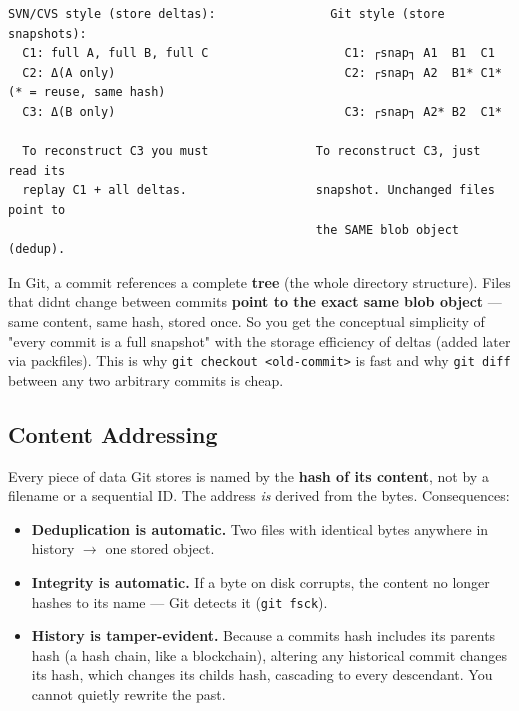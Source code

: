 \documentclass[11pt]{article}
\providecommand{\tightlist}{\setlength{\itemsep}{1pt}\setlength{\parskip}{0pt}}
\begin{document}
\setcodelang{}

\begin{verbatim}
SVN/CVS style (store deltas):                Git style (store snapshots):
  C1: full A, full B, full C                   C1: ┌snap┐ A1  B1  C1
  C2: Δ(A only)                                C2: ┌snap┐ A2  B1* C1*   (* = reuse, same hash)
  C3: Δ(B only)                                C3: ┌snap┐ A2* B2  C1*

  To reconstruct C3 you must               To reconstruct C3, just read its
  replay C1 + all deltas.                  snapshot. Unchanged files point to
                                           the SAME blob object (dedup).
\end{verbatim}

In Git, a commit references a complete \textbf{tree} (the whole directory structure). Files that didn\textquotesingle t change between commits \textbf{point to the exact same blob object} --- same content, same hash, stored once. So you get the conceptual simplicity of "every commit is a full snapshot" with the storage efficiency of deltas (added later via packfiles). This is why \texttt{git\ checkout\ \textless{}old-commit\textgreater{}} is fast and why \texttt{git\ diff} between any two arbitrary commits is cheap.

\subsection{Content Addressing}\label{content-addressing}

Every piece of data Git stores is named by the \textbf{hash of its content}, not by a filename or a sequential ID. The address \emph{is} derived from the bytes. Consequences:

\begin{itemize}
\tightlist
\item
  \textbf{Deduplication is automatic.} Two files with identical bytes anywhere in history \(\rightarrow\) one stored object.
\item
  \textbf{Integrity is automatic.} If a byte on disk corrupts, the content no longer hashes to its name --- Git detects it (\texttt{git\ fsck}).
\item
  \textbf{History is tamper-evident.} Because a commit\textquotesingle s hash includes its parent\textquotesingle s hash (a hash chain, like a blockchain), altering any historical commit changes its hash, which changes its child\textquotesingle s hash, cascading to every descendant. You cannot quietly rewrite the past.
\end{itemize}
\end{document}
